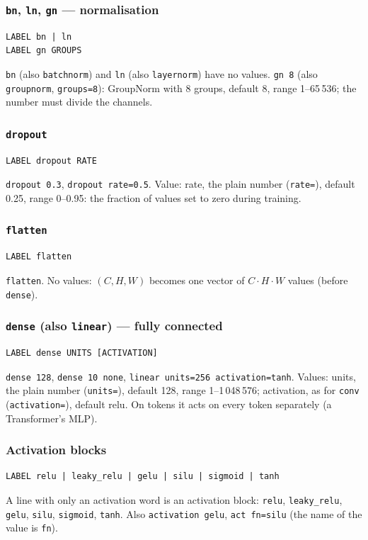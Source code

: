 \subsubsection*{\texttt{bn}, \texttt{ln}, \texttt{gn} --- normalisation}
\begin{Verbatim}[fontsize=\small]
LABEL bn | ln
LABEL gn GROUPS
\end{Verbatim}
\texttt{bn} (also \texttt{batchnorm}) and \texttt{ln} (also \texttt{layernorm}) have no values. \texttt{gn 8} (also \texttt{groupnorm},
\texttt{groups=8}): GroupNorm with 8 groups, default 8, range 1--65\,536; the number must divide the channels.

\subsubsection*{\texttt{dropout}}
\begin{Verbatim}[fontsize=\small]
LABEL dropout RATE
\end{Verbatim}
\texttt{dropout 0.3}, \texttt{dropout rate=0.5}. Value: rate, the plain number (\texttt{rate=}), default 0.25, range 0--0.95: the
fraction of values set to zero during training.

\subsubsection*{\texttt{flatten}}
\begin{Verbatim}[fontsize=\small]
LABEL flatten
\end{Verbatim}
\texttt{flatten}. No values: $(C, H, W)$ becomes one vector of $C\cdot H\cdot W$ values (before \texttt{dense}).

\subsubsection*{\texttt{dense} (also \texttt{linear}) --- fully connected}
\begin{Verbatim}[fontsize=\small]
LABEL dense UNITS [ACTIVATION]
\end{Verbatim}
\texttt{dense 128}, \texttt{dense 10 none}, \texttt{linear units=256 activation=tanh}. Values: units, the plain number (\texttt{units=}),
default 128, range 1--1\,048\,576; activation, as for \texttt{conv} (\texttt{activation=}), default relu. On tokens it acts on every token
separately (a Transformer's MLP).

\subsubsection*{Activation blocks}
\begin{Verbatim}[fontsize=\small]
LABEL relu | leaky_relu | gelu | silu | sigmoid | tanh
\end{Verbatim}
A line with only an activation word is an activation block: \texttt{relu}, \texttt{leaky\_relu}, \texttt{gelu}, \texttt{silu},
\texttt{sigmoid}, \texttt{tanh}. Also \texttt{activation gelu}, \texttt{act fn=silu} (the name of the value is \texttt{fn}).

